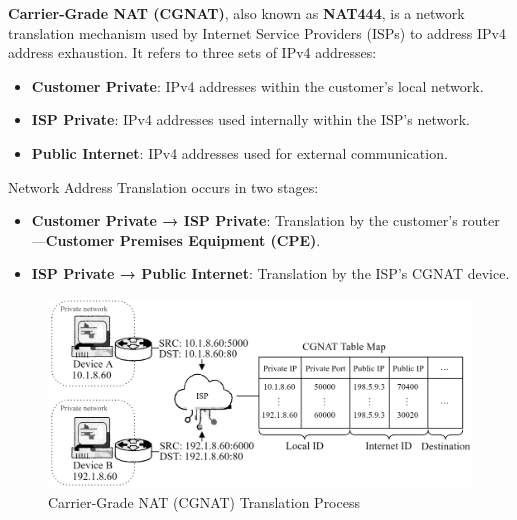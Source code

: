 \begin{Def}

    \textbf{Carrier-Grade NAT (CGNAT)}, also known as \textbf{NAT444}, is a network translation mechanism used by Internet Service Providers (ISPs) to address IPv4 address exhaustion. It refers to three sets of IPv4 addresses:
    \begin{itemize}
        \item \textbf{Customer Private}: IPv4 addresses within the customer's local network.
        \item \textbf{ISP Private}: IPv4 addresses used internally within the ISP's network.
        \item \textbf{Public Internet}: IPv4 addresses used for external communication.
    \end{itemize}
    
    Network Address Translation occurs in two stages:
    \begin{itemize}
        \item \textbf{Customer Private → ISP Private}: Translation by the customer's router---\textbf{Customer Premises Equipment (CPE)}.
        \item \textbf{ISP Private → Public Internet}: Translation by the ISP's CGNAT device.
    \end{itemize}

    \hfill \cite{rfc2663}\cite{rbfs_cgnat}
    
\end{Def}
    
\newpage

\begin{figure}[h!]
    \hspace{-2.5em}
    \includegraphics[width=1.1\textwidth]{Sections/network/cgnat.png}
    \caption{Carrier-Grade NAT (CGNAT) Translation Process}
    \label{fig:cgnat}
\end{figure}